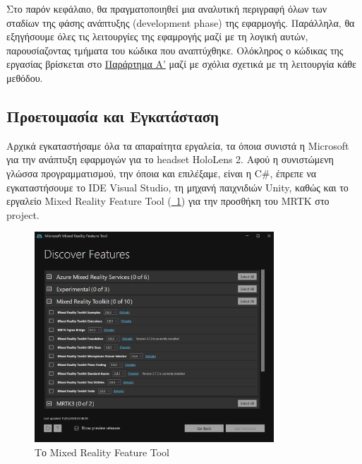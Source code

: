 
Στο παρόν κεφάλαιο, θα πραγματοποιηθεί μια αναλυτική περιγραφή όλων των σταδίων της φάσης ανάπτυξης (development phase) της εφαρμογής. Παράλληλα, θα εξηγήσουμε όλες τις λειτουργίες της εφαμρογής μαζί με τη λογική αυτών, παρουσίαζοντας τμήματα του κώδικα που αναπτύχθηκε.
Ολόκληρος ο κώδικας της εργασίας βρίσκεται στο \hyperref[ch:appendixA]{Παράρτημα Α'} μαζί με σχόλια σχετικά με τη λειτουργία κάθε μεθόδου.

\subsection{Προετοιμασία και Εγκατάσταση}\label{subsec:developSetup}

Αρχικά εγκαταστήσαμε όλα τα απαραίτητα εργαλεία, τα όποια συνιστά η Microsoft για την ανάπτυξη εφαρμογών για το headset HoloLens 2. Αφού η συνιστώμενη γλώσσα προγραμματισμού, την όποια και επιλέξαμε, είναι η C\#, έπρεπε να εγκαταστήσουμε το IDE Visual Studio, τη μηχανή παιχνιδιών Unity, καθώς και το εργαλείο Mixed Reality Feature Tool (\hyperref[fig:mrft]{\schema~\ref*{fig:mrft}}) για την προσθήκη του MRTK στο project.

\begin{figure}[!h]
    \centering
    \includegraphics[width=0.8\textwidth]{images/mixed_reality_feature_tool.png}
    \caption{Το Mixed Reality Feature Tool}\label{fig:mrft}
\end{figure}

